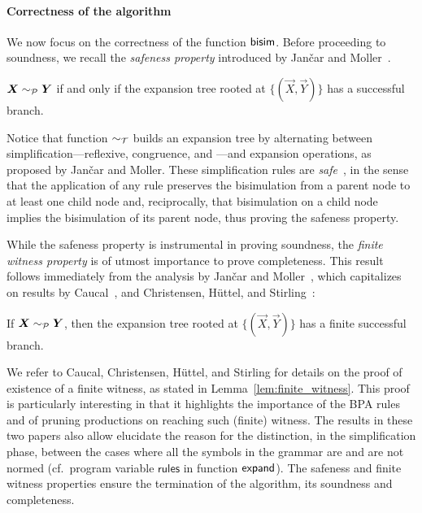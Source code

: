 \paragraph{Correctness of the algorithm}

We now focus on the correctness of the function $\mathsf{bisim}$.  Before
proceeding to soundness, we recall the \emph{safeness property}
introduced by Jan{\v{c}}ar and Moller~\cite{janvcar1999techniques}.

\begin{lemma} 
  \label{lem:safeness}
  $\vec X \ProdEquiv \vec Y$ if and only if the expansion tree rooted
  at $\{(\vec X, \vec Y)\}$ has a successful branch.
\end{lemma}

Notice that function $\sim_\mathcal T$ builds an expansion tree by alternating
between simplification---reflexive, congruence, and \BPA---and
expansion operations, as proposed by Jan{\v{c}}ar and Moller.
%
These simplification rules are
\emph{safe}~\cite{janvcar1999techniques}, in the sense that the
application of any rule preserves the bisimulation from a parent node
to at least one child node and, reciprocally, that bisimulation on a
child node implies the bisimulation of its parent node, thus proving
the safeness property.

While the safeness property is instrumental in proving
soundness, the \emph{finite witness property} is of
utmost importance to prove completeness. This result follows
immediately from the analysis by Jan{\v{c}}ar and
Moller~\cite{janvcar1999techniques}, which capitalizes on results by
Caucal~\cite{caucal1986decidabilite}, and Christensen, H{\"{u}}ttel, and
Stirling~\cite{DBLP:journals/iandc/ChristensenHS95}:

\begin{lemma} 
\label{lem:finite_witness}
	If $\vec X \ProdEquiv \vec Y$, then the expansion tree rooted at
	$\{(\vec X, \vec Y)\}$ has a finite successful branch.
\end{lemma}

We refer to Caucal, Christensen, H{\"{u}}ttel, and Stirling for
details on the proof of existence of a finite witness, as stated in
Lemma~\ref{lem:finite_witness}. This proof is particularly interesting in
that it highlights the importance of the BPA rules and of pruning
productions on reaching such (finite) witness. The results in these
two papers also allow elucidate the reason for the distinction, in
the simplification phase, between the cases where all the symbols in
the grammar are and are not normed (cf.~program variable
$\mathsf{rules}$ in function $\mathsf{expand}$).
%
The safeness and finite witness properties ensure the termination of
the algorithm, its soundness and completeness.

